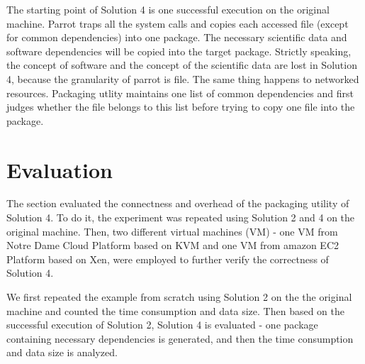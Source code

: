 \documentclass{sig-alternate}
\begin{document}
The starting point of Solution 4 is one successful execution on the original machine. 
Parrot traps all the system calls and copies each accessed file (except for common dependencies) into one package.
The necessary scientific data and software dependencies will be copied into the target package.
Strictly speaking, the concept of software and the concept of the scientific data are lost in Solution 4, because
the granularity of parrot is file.
The same thing happens to networked resources.
Packaging utlity maintains one list of common dependencies and first judges whether the file belongs to this list before trying to copy one file into the package.



\section{Evaluation}
The section evaluated the connectness and overhead of the packaging utility of Solution 4.
To do it, the experiment was repeated using Solution 2 and 4 on the original machine.
Then, two different virtual machines (VM) - one VM from Notre Dame Cloud Platform based on KVM and one VM from amazon EC2 Platform based on Xen, were employed to further verify the correctness of Solution 4.

We first repeated the example from scratch using Solution 2 on the the original machine and counted the time consumption and data size. 
Then based on the successful execution of Solution 2, Solution 4 is evaluated - one package containing necessary dependencies is generated, and then the time consumption and data size is analyzed. 
\end{document}
